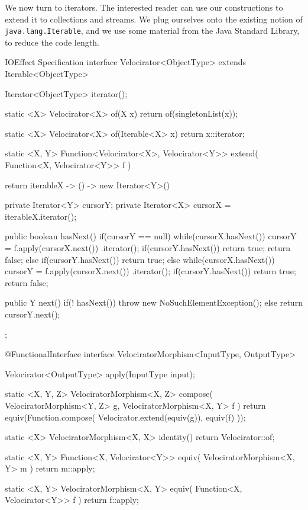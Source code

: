 \documentclass[12pt,a4paper]{report}
\renewcommand{\baselinestretch}{1.5}
\theoremstyle{theorem}
\theoremstyle{definition}
\begin{document}
We now turn to iterators. The interested reader can use our
constructions to extend it to collections and streams.
We plug ourselves onto the existing notion of
\lstinline{java.lang.Iterable}{},
and we use some material from the Java Standard Library, to
reduce the code length.

\renewcommand{\baselinestretch}{1} 
\selectfont

\begin{javacode}{IOEffect Specification}
interface Velocirator<ObjectType> extends Iterable<ObjectType>
{
  Iterator<ObjectType> iterator();
  
  static <X> Velocirator<X> of(X x)
    { return of(singletonList(x)); }
    
  static <X> Velocirator<X> of(Iterable<X> x)
    { return x::iterator; }

  static <X, Y> Function<Velocirator<X>, Velocirator<Y>> extend(
    Function<X, Velocirator<Y>> f
  ) {
    return iterableX -> () -> new Iterator<Y>() {
      private Iterator<Y> cursorY;
      private Iterator<X> cursorX = iterableX.iterator();
      
      public boolean hasNext() {
        if(cursorY == null) {
          while(cursorX.hasNext()) {
            cursorY = f.apply(cursorX.next())
                      .iterator();
            if(cursorY.hasNext()) {
              return true;
            }
          }
          return false;
        } else {
          if(cursorY.hasNext()) {
            return true;
          } else {
            while(cursorX.hasNext()) {
              cursorY = f.apply(cursorX.next())
                        .iterator();
              if(cursorY.hasNext()) {
                return true;
              }
            }
            return false;
          }
        }      
      }
      
      public Y next() {
        if(! hasNext())
          throw new NoSuchElementException();
        else return cursorY.next();
      }
    };
  }
}

@FunctionalInterface
interface VelociratorMorphism<InputType, OutputType>
{
  Velocirator<OutputType> apply(InputType input);
	
  static <X, Y, Z> VelociratorMorphism<X, Z> compose(
    VelociratorMorphism<Y, Z> g,
    VelociratorMorphism<X, Y> f
  )
    { return equiv(Function.compose(
      Velocirator.extend(equiv(g)), equiv(f)
    )); }
    
  static <X> VelociratorMorphism<X, X> identity()
    { return Velocirator::of; }
  
  static <X, Y> Function<X, Velocirator<Y>> equiv(
    VelociratorMorphism<X, Y> m
  )
    { return m::apply; }
  
  static <X, Y> VelociratorMorphism<X, Y> equiv(
    Function<X, Velocirator<Y>> f
  )
    { return f::apply; }
}
\end{javacode}
\end{document}
